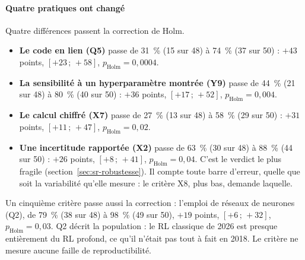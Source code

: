 \paragraph{Quatre pratiques ont changé}
Quatre différences passent la correction de Holm.
\begin{itemize}
  \item \textbf{Le code en lien (Q5)} passe de 31~\% (15 sur 48) à 74~\% (37 sur 50) : $+43$ points,
  $[+23\,;\,+58]$, $p_{\text{Holm}} = 0{,}0004$.
  \item \textbf{La sensibilité à un hyperparamètre montrée (Y9)} passe de 44~\% (21 sur 48) à 80~\% (40
  sur 50) : $+36$ points, $[+17\,;\,+52]$, $p_{\text{Holm}} = 0{,}004$.
  \item \textbf{Le calcul chiffré (X7)} passe de 27~\% (13 sur 48) à 58~\% (29 sur 50) : $+31$ points,
  $[+11\,;\,+47]$, $p_{\text{Holm}} = 0{,}02$.
  \item \textbf{Une incertitude rapportée (X2)} passe de 63~\% (30 sur 48) à 88~\% (44 sur 50) : $+26$
  points, $[+8\,;\,+41]$, $p_{\text{Holm}} = 0{,}04$. C'est le verdict le plus fragile
  (section~\ref{sec:sr-robustesse}). Il compte toute barre d'erreur, quelle que soit la variabilité qu'elle
  mesure : le critère X8, plus bas, demande laquelle.
\end{itemize}
Un cinquième critère passe aussi la correction : l'emploi de réseaux de neurones (Q2), de 79~\% (38
sur 48) à 98~\% (49 sur 50), $+19$ points, $[+6\,;\,+32]$, $p_{\text{Holm}} = 0{,}03$. Q2 décrit la
population : le RL classique de 2026 est presque entièrement du RL profond, ce qu'il n'était pas tout à
fait en 2018. Le critère ne mesure aucune faille de reproductibilité.

